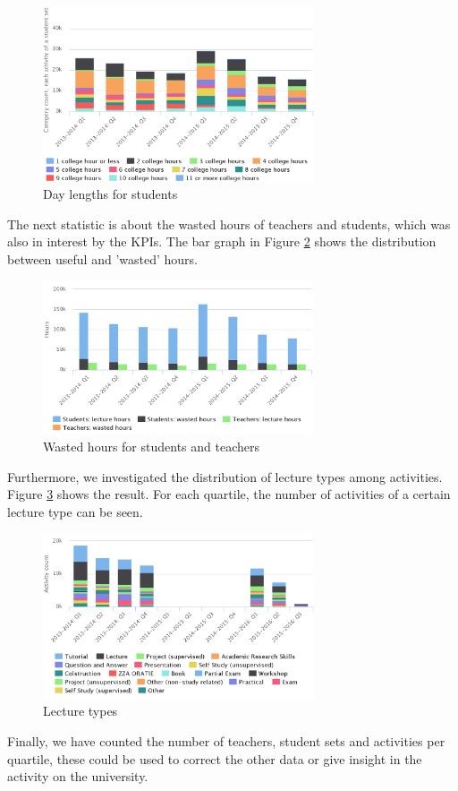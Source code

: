 \begin{figure}[!h]
	\centering
	\includegraphics[width=80mm]{dayLengthsStudents.png}
	\caption{Day lengths for students}
	\label{fig:dayLengtsStudents}
\end{figure}

The next statistic is about the wasted hours of teachers and students, which was also in interest by the KPIs. The bar graph in Figure \ref{fig:wastedHours} shows the distribution between useful and 'wasted' hours.

\begin{figure}[!h]
	\centering
	\includegraphics[width=80mm]{wastedHours.png}
	\caption{Wasted hours for students and teachers}
	\label{fig:wastedHours}
\end{figure}

Furthermore, we investigated the distribution of lecture types among activities. Figure \ref{fig:lectureTypes} shows the result. For each quartile, the number of activities of a certain lecture type can be seen.

\begin{figure}[!h]
	\centering
	\includegraphics[width=80mm]{lectureTypes.png}
	\caption{Lecture types}
	\label{fig:lectureTypes}
\end{figure}

Finally, we have counted the number of teachers, student sets and activities per quartile, these could be used to correct the other data or give insight in the activity on the university.
